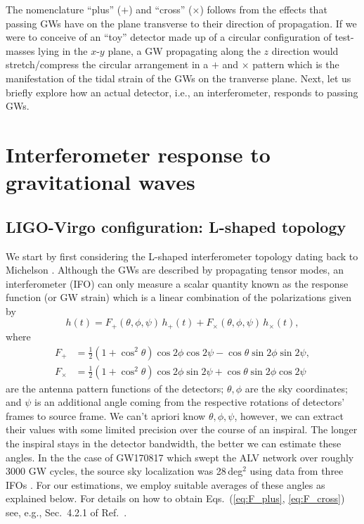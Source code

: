 \documentclass[prd,amsmath,amssymb,aps,floats,amsfonts,notitlepage,superscriptaddress,eqsecnum,nofootinbib,10pt]{revtex4-1}
\newcommand{\f}{\frac}
\newcommand{\be}{\begin{equation}}
\newcommand{\ee}{\end{equation}}
\begin{document}
The nomenclature ``plus'' ($+$) and ``cross'' ($\times$) follows from the effects that passing GWs have on the plane transverse to their direction of propagation.
If we were to conceive of an ``toy'' detector made up of a circular configuration of test-masses lying in the $x$-$y$ plane, a GW propagating along the $z$ direction would stretch/compress the circular arrangement in a $+$ and $\times$ pattern which is the manifestation of the tidal strain of the GWs on the tranverse plane.
Next, let us briefly explore how an actual detector, i.e., an interferometer, responds to passing GWs.


\section{Interferometer response to gravitational waves}\label{sec:IFO_response}
\subsection{LIGO-Virgo configuration: L-shaped topology}\label{sec:LIGO_topo}
We start by first considering the L-shaped interferometer topology dating back to Michelson \cite{Michelson:1887zz}.
Although the GWs are described by propagating tensor modes, an interferometer (IFO) can only measure a scalar quantity
known as the response function (or GW strain) which is a linear combination of the polarizations given by
%
\be
h(t) = F_+(\theta,\phi,\psi) \,h_+(t)+F_\times(\theta,\phi,\psi)\, h_\times(t) , \label{eq:detector_strain}
\ee
%
where
%
\begin{align}
 F_+ &=\f{1}{2}\left(1+\cos^2\theta\right)\cos2\phi\cos 2\psi-\cos\theta \sin2\phi \sin2\psi \label{eq:F_plus},\\
 F_\times &=\f{1}{2}\left(1+\cos^2\theta\right)\cos2\phi\sin2\psi+\cos\theta \sin2\phi \cos2\psi \label{eq:F_cross}
\end{align}
%
are the antenna pattern functions of the detectors; $\theta,\phi$ are the sky coordinates; and $\psi$ is
an additional angle coming from the respective rotations of detectors' frames to source frame. %
%
We can't apriori know $\theta, \phi,\psi$, however, we can extract their values with some limited precision over the course of an inspiral.
The longer the inspiral stays in the detector bandwidth, the better we can estimate these angles.
In the the case of GW170817 which swept the ALV network over roughly 3000 GW cycles, 
the source sky localization was 28\,deg$^2$ using data from three IFOs \cite{GW170817}. 
For our estimations, we employ suitable averages of these angles as explained below.
For details on how to obtain Eqs.~(\ref{eq:F_plus}, \ref{eq:F_cross}) see, e.g., Sec.~4.2.1 of Ref.~\cite{SchutzLRR}.
\end{document}
